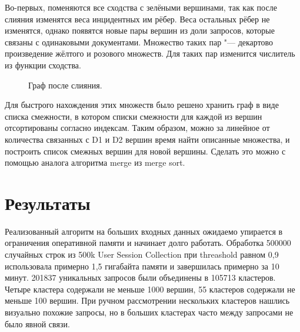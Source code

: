 \documentclass{article}
\begin{document}
Во-первых, поменяются все сходства с зелёными вершинами, так как после слияния изменятся веса инцидентных им рёбер.
Веса остальных рёбер не изменятся, однако появятся новые пары вершин из доли запросов, которые связаны с одинаковыми документами.
Множество таких пар "--- декартово произведение жёлтого и розового множеств.
Для таких пар изменится числитель из функции сходства.

\begin{figure}[h]
    \centering
    \caption{Граф после слияния.}
    \label{diagram}
\end{figure}

Для быстрого нахождения этих множеств было решено хранить граф в виде списка смежности,
в котором списки смежности для каждой из вершин отсортированы согласно индексам.
Таким образом, можно за линейное от количества связанных с D1 и D2 вершин время найти описанные множества,
и построить список смежных вершин для новой вершины.
Сделать это можно с помощью аналога алгоритма merge из merge sort.

\section{\texorpdfstring{Результаты}{Results}}
Реализованный алгоритм на больших входных данных ожидаемо упирается в ограничения оперативной памяти и начинает долго работать.
Обработка 500000 случайных строк из 500k User Session Collection при threashold равном 0,9 использовала примерно 1,5 гигабайта памяти
и завершилась примерно за 10 минут.
201837 уникальных запросов были объединены в 105713 кластеров.
Четыре кластера содержали не меньше 1000 вершин,
55 кластеров содержали не меньше 100 вершин.
При ручном рассмотрении нескольких кластеров нашлись визуально похожие запросы,
но в больших кластерах часто между запросами не было явной связи.
\end{document}
